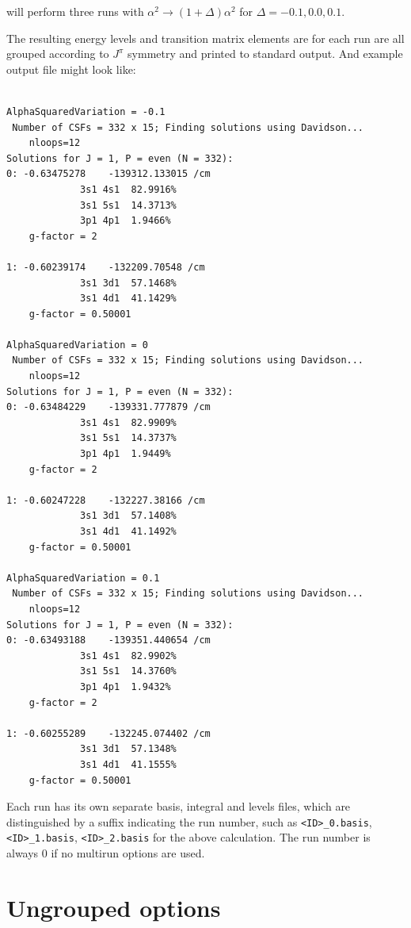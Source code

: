 \documentclass{report}
\begin{document}
will perform three runs with $\alpha^2 \to (1 + \Delta)\alpha^2$ for $\Delta = -0.1, 0.0, 0.1$.

The resulting energy levels and transition matrix elements are for each run are all grouped according to
$J^{\pi}$ symmetry and printed to standard output. And example output file might look like:

\begin{verbatim}

AlphaSquaredVariation = -0.1
 Number of CSFs = 332 x 15; Finding solutions using Davidson...
    nloops=12
Solutions for J = 1, P = even (N = 332):
0: -0.63475278    -139312.133015 /cm
             3s1 4s1  82.9916%
             3s1 5s1  14.3713%
             3p1 4p1  1.9466%
    g-factor = 2

1: -0.60239174    -132209.70548 /cm
             3s1 3d1  57.1468%
             3s1 4d1  41.1429%
    g-factor = 0.50001

AlphaSquaredVariation = 0
 Number of CSFs = 332 x 15; Finding solutions using Davidson...
    nloops=12
Solutions for J = 1, P = even (N = 332):
0: -0.63484229    -139331.777879 /cm
             3s1 4s1  82.9909%
             3s1 5s1  14.3737%
             3p1 4p1  1.9449%
    g-factor = 2

1: -0.60247228    -132227.38166 /cm
             3s1 3d1  57.1408%
             3s1 4d1  41.1492%
    g-factor = 0.50001

AlphaSquaredVariation = 0.1
 Number of CSFs = 332 x 15; Finding solutions using Davidson...
    nloops=12
Solutions for J = 1, P = even (N = 332):
0: -0.63493188    -139351.440654 /cm
             3s1 4s1  82.9902%
             3s1 5s1  14.3760%
             3p1 4p1  1.9432%
    g-factor = 2

1: -0.60255289    -132245.074402 /cm
             3s1 3d1  57.1348%
             3s1 4d1  41.1555%
    g-factor = 0.50001

\end{verbatim}

Each run has its own separate basis, integral and levels files, which are distinguished by a suffix
indicating the run number, such as \texttt{<ID>\_0.basis}, \texttt{<ID>\_1.basis}, 
\texttt{<ID>\_2.basis} for the above calculation. The run number is always 0 if no multirun options are
used.

\section{Ungrouped options}
\label{sec:ungrouped}
\end{document}
